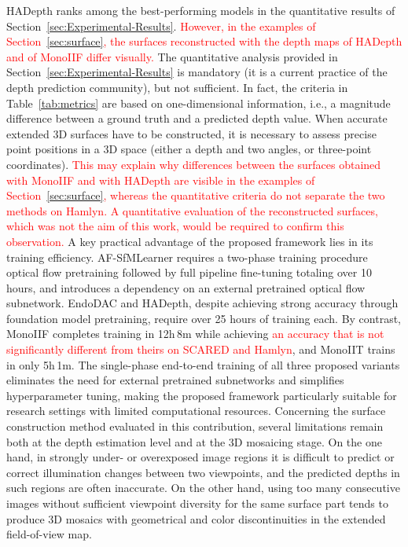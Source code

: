 \documentclass[a4paper,fleqn]{cas-dc}
\begin{document}
%
HADepth ranks among the best-performing models in the quantitative results of Section~\ref{sec:Experimental-Results}. \textcolor{red}{However, in the examples of Section~\ref{sec:surface}, the surfaces reconstructed with the depth maps of HADepth and of MonoIIF differ visually.} The quantitative analysis provided in Section~\ref{sec:Experimental-Results} is mandatory (it is a current practice of the depth prediction community), but not sufficient. In fact, the criteria in Table~\ref{tab:metrics} are based on one-dimensional information, i.e., a magnitude difference between a ground truth and a predicted depth value. When accurate extended 3D surfaces have to be constructed, it is necessary to assess precise point positions in a 3D space (either a depth and two angles, or three-point coordinates). \textcolor{red}{This may explain why differences between the surfaces obtained with MonoIIF and with HADepth are visible in the examples of Section~\ref{sec:surface}, whereas the quantitative criteria do not separate the two methods on Hamlyn. A quantitative evaluation of the reconstructed surfaces, which was not the aim of this work, would be required to confirm this observation.}
%
A key practical advantage of the proposed framework lies in its training efficiency. AF-SfMLearner requires a two-phase training procedure optical flow pretraining followed by full pipeline fine-tuning totaling over 10 hours, and introduces a dependency on an external pretrained optical flow subnetwork. EndoDAC and HADepth, despite achieving strong accuracy through foundation model pretraining, require over 25 hours of training each. By contrast, MonoIIF completes training in 12h\,8m while achieving \textcolor{red}{an accuracy that is not significantly different from theirs on SCARED and Hamlyn}, and MonoIIT trains in only 5h\,1m. The single-phase end-to-end training of all three proposed variants eliminates the need for external pretrained subnetworks and simplifies hyperparameter tuning, making the proposed framework particularly suitable for research settings with limited computational resources.
%
Concerning the surface construction method evaluated in this contribution, several limitations remain both at the depth estimation level and at the 3D mosaicing stage. On the one hand, in strongly under- or overexposed image regions it is difficult to predict or correct illumination changes between two viewpoints, and the predicted depths in such regions are often inaccurate. On the other hand, using too many consecutive images without sufficient viewpoint diversity for the same surface part tends to produce 3D mosaics with geometrical and color discontinuities in the extended field-of-view map.
%
\end{document}
